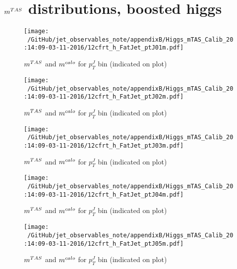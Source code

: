 \clearpage
\onecolumn
\vspace*{\fill}
\section{$m^{TAS}$  distributions, boosted higgs}
\vfill
\clearpage
\twocolumn

\begin{figure}
 
\texttt{[image: ~/GitHub/jet\_observables\_note/appendixB/Higgs\_mTAS\_Calib\_20:14:09-03-11-2016/12cfrt\_h\_FatJet\_ptJ01m.pdf]}
\caption{$m^{TAS}$ and $m^{calo}$ for $p_{T}^{J}$ bin (indicated on plot) }
 
\end{figure}
 
\begin{figure}
 
\texttt{[image: ~/GitHub/jet\_observables\_note/appendixB/Higgs\_mTAS\_Calib\_20:14:09-03-11-2016/12cfrt\_h\_FatJet\_ptJ02m.pdf]}
\caption{$m^{TAS}$ and $m^{calo}$ for $p_{T}^{J}$ bin (indicated on plot) }
 
\end{figure}
 
\begin{figure}
 
\texttt{[image: ~/GitHub/jet\_observables\_note/appendixB/Higgs\_mTAS\_Calib\_20:14:09-03-11-2016/12cfrt\_h\_FatJet\_ptJ03m.pdf]}
\caption{$m^{TAS}$ and $m^{calo}$ for $p_{T}^{J}$ bin (indicated on plot) }
 
\end{figure}
 
\begin{figure}
 
\texttt{[image: ~/GitHub/jet\_observables\_note/appendixB/Higgs\_mTAS\_Calib\_20:14:09-03-11-2016/12cfrt\_h\_FatJet\_ptJ04m.pdf]}
\caption{$m^{TAS}$ and $m^{calo}$ for $p_{T}^{J}$ bin (indicated on plot) }
 
\end{figure}
 
\begin{figure}
 
\texttt{[image: ~/GitHub/jet\_observables\_note/appendixB/Higgs\_mTAS\_Calib\_20:14:09-03-11-2016/12cfrt\_h\_FatJet\_ptJ05m.pdf]}
\caption{$m^{TAS}$ and $m^{calo}$ for $p_{T}^{J}$ bin (indicated on plot) }
 
\end{figure}
 
